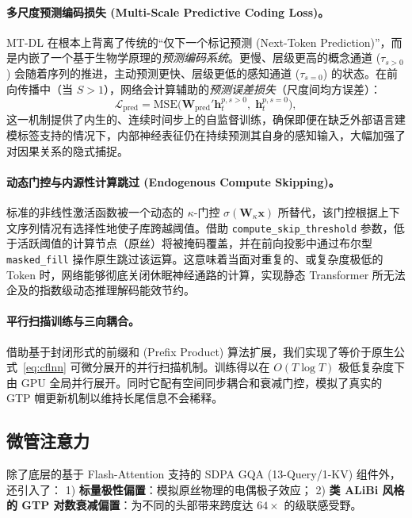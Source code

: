\documentclass[11pt]{article}
\theoremstyle{definition}
\newcommand{\vh}{\mathbf{h}}
\newcommand{\vx}{\mathbf{x}}
\newcommand{\sigmoid}{\sigma}
\begin{document}
\paragraph{多尺度预测编码损失 (Multi-Scale Predictive Coding Loss)。}
MT-DL 在根本上背离了传统的“仅下一个标记预测 (Next-Token Prediction)”，而是内嵌了一个基于生物学原理的\emph{预测编码系统}。更慢、层级更高的概念通道 ($\tau_{s>0}$) 会随着序列的推进，主动预测更快、层级更低的感知通道 ($\tau_{s=0}$) 的状态。在前向传播中（当 $S>1$），网络会计算辅助的\emph{预测误差损失}（尺度间均方误差）：
\begin{equation}
  \mathcal{L}_\text{pred} = \mathrm{MSE}\Big(\mathbf{W}_\text{pred}' \vh^{p, s>0}_{t},\; \vh^{p, s=0}_{t}\Big),
\end{equation}
这一机制提供了内生的、连续时间步上的自监督训练，确保即便在缺乏外部语言建模标签支持的情况下，内部神经表征仍在持续预测其自身的感知输入，大幅加强了对因果关系的隐式捕捉。

\paragraph{动态门控与内源性计算跳过 (Endogenous Compute Skipping)。}
标准的非线性激活函数被一个动态的 $\kappa$-门控 $\sigmoid(\mathbf{W}_{\kappa}\vx)$ 所替代，该门控根据上下文序列情况有选择性地使子库跨越阈值。借助 \texttt{compute\_skip\_threshold} 参数，低于活跃阈值的计算节点（原丝）将被掩码覆盖，并在前向投影中通过布尔型 \texttt{masked\_fill} 操作原生跳过该运算。这意味着当面对重复的、或复杂度极低的 Token 时，网络能够彻底关闭休眠神经通路的计算，实现静态 Transformer 所无法企及的指数级动态推理解码能效节约。

\paragraph{平行扫描训练与三向耦合。}
借助基于封闭形式的前缀和 (Prefix Product) 算法扩展，我们实现了等价于原生公式~\eqref{eq:cflnn} 可微分展开的并行扫描机制。训练得以在 $O(T\log T)$ 极低复杂度下由 GPU 全局并行展开。同时它配有空间同步耦合和衰减门控，模拟了真实的 GTP 帽更新机制以维持长尾信息不会稀释。

\subsection{微管注意力}
\label{sec:attn}

除了底层的基于 Flash-Attention 支持的 SDPA GQA (13-Query/1-KV) 组件外，还引入了：
1) \textbf{标量极性偏置}：模拟原丝物理的电偶极子效应；
2) \textbf{类 ALiBi 风格的 GTP 对数衰减偏置}：为不同的头部带来跨度达 $64\times$ 的级联感受野。
\end{document}
